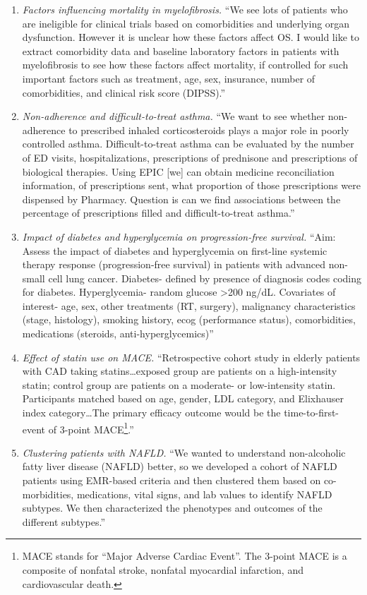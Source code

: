 \begin{enumerate}
\item \textit{Factors influencing mortality in myelofibrosis.} ``We see lots of patients who are ineligible for clinical trials based on comorbidities and underlying organ dysfunction. However it is unclear how these factors affect OS. I would like to extract comorbidity data and baseline laboratory factors in patients with myelofibrosis to see how these factors affect mortality, if controlled for such important factors such as treatment, age, sex, insurance, number of comorbidities, and clinical risk score (DIPSS).''
\item \textit{Non-adherence and difficult-to-treat asthma.} ``We want to see whether non-adherence to prescribed inhaled corticosteroids plays a major role in poorly controlled asthma. Difficult-to-treat asthma can be evaluated by the number of ED visits, hospitalizations, prescriptions of prednisone and prescriptions of biological therapies. Using EPIC [we] can obtain medicine reconciliation information, of prescriptions sent, what proportion of those prescriptions were dispensed by Pharmacy. Question is can we find associations between the percentage of prescriptions filled and difficult-to-treat asthma.''
\item \textit{Impact of diabetes and hyperglycemia on progression-free survival.} ``Aim: Assess the impact of diabetes and hyperglycemia on first-line systemic therapy response (progression-free survival) in patients with advanced non-small cell lung cancer. Diabetes- defined by presence of diagnosis codes coding for diabetes. Hyperglycemia- random glucose >200 ng/dL. Covariates of interest- age, sex, other treatments (RT, surgery), malignancy characteristics (stage, histology), smoking history, ecog (performance status), comorbidities, medications (steroids, anti-hyperglycemics)''
\item \textit{Effect of statin use on MACE.} ``Retrospective cohort study in elderly patients with CAD taking statins\dots exposed group are patients on a high-intensity statin; control group are patients on a moderate- or low-intensity statin. Participants matched based on age, gender, LDL category, and Elixhauser index category\dots The primary efficacy outcome would be the time-to-first-event of 3-point MACE\footnote{MACE stands for ``Major Adverse Cardiac Event''. The 3-point MACE is a composite of nonfatal stroke, nonfatal myocardial infarction, and cardiovascular death.}.''
\item \textit{Clustering patients with NAFLD.} ``We wanted to understand non-alcoholic fatty liver disease (NAFLD) better, so we developed a cohort of NAFLD patients using EMR-based criteria and then clustered them based on co-morbidities, medications, vital signs, and lab values to identify NAFLD subtypes. We then characterized the phenotypes and outcomes of the different subtypes.''
\end{enumerate}

